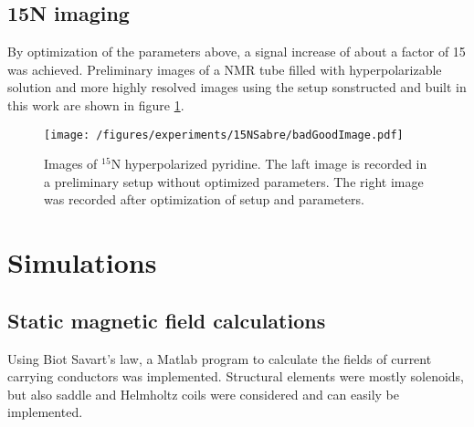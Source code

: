         \subsection{15N imaging}
        By optimization of the parameters above, a signal increase of about a factor of 15 was achieved. Preliminary images of a NMR tube filled with hyperpolarizable solution and more highly resolved images using the setup sonstructed and built in this work are shown in figure \ref{fig:results:15Nimage}.
        \begin{figure}
            \texttt{[image: /figures/experiments/15NSabre/badGoodImage.pdf]}
            \caption[15N image]{Images of $^{15}$N hyperpolarized pyridine. The laft image is recorded in a preliminary setup without optimized parameters. The right image was recorded after optimization of setup and parameters.}
            \label{fig:results:15Nimage}

        \end{figure}
\section{Simulations}
        \label{sec:results:sim}
        \subsection{Static magnetic field calculations}
        \label{sec:results:sim:B0}
            Using Biot Savart's law, a Matlab program to calculate the fields of current carrying conductors was implemented. Structural elements were mostly solenoids, but also saddle and Helmholtz coils were considered and can easily be implemented.
